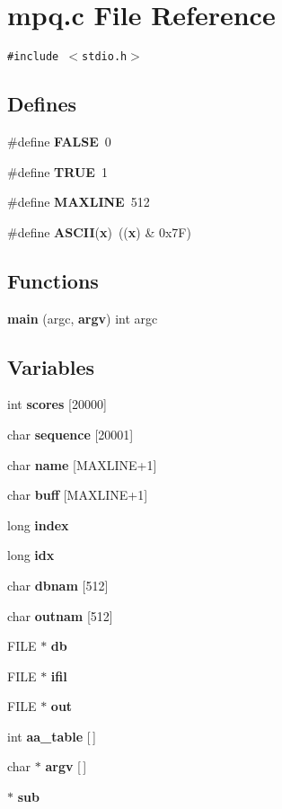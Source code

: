 \section{mpq.c File Reference}
\label{mpq_8c}
{\tt \#include $<$stdio.h$>$}\par
\subsection*{Defines}
\begin{CompactItemize}
\item 
\#define {\bf FALSE}\ 0
\item 
\#define {\bf TRUE}\ 1
\item 
\#define {\bf MAXLINE}\ 512
\item 
\#define {\bf ASCII}({\bf x})\ (({\bf x}) \& 0x7F)
\end{CompactItemize}
\subsection*{Functions}
\begin{CompactItemize}
\item 
{\bf main} (argc, {\bf argv}) int argc
\end{CompactItemize}
\subsection*{Variables}
\begin{CompactItemize}
\item 
int {\bf scores} [20000]
\item 
char {\bf sequence} [20001]
\item 
char {\bf name} [MAXLINE+1]
\item 
char {\bf buff} [MAXLINE+1]
\item 
long {\bf index}
\item 
long {\bf idx}
\item 
char {\bf dbnam} [512]
\item 
char {\bf outnam} [512]
\item 
FILE $\ast$ {\bf db}
\item 
FILE $\ast$ {\bf ifil}
\item 
FILE $\ast$ {\bf out}
\item 
int {\bf aa\_\-table} [$\,$]
\item 
char $\ast$ {\bf argv} [$\,$]
\item 
$\ast$ {\bf sub}
\end{CompactItemize}


